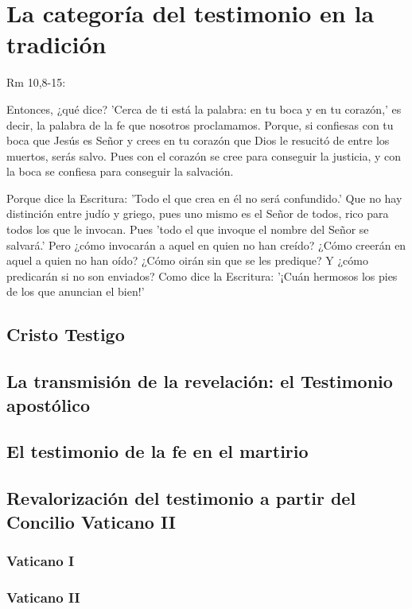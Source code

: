 \section{La categoría del testimonio en la tradición}

Rm 10,8-15: 

Entonces, ¿qué dice? 'Cerca de ti está la palabra: en tu boca y en tu corazón,'
es decir, la palabra de la fe que nosotros proclamamos. Porque, si confiesas con
tu boca que Jesús es Señor y crees en tu corazón que Dios le resucitó de entre
los muertos, serás salvo. Pues con el corazón se cree para conseguir la
justicia, y con la boca se confiesa para conseguir la salvación.

Porque dice la Escritura: 'Todo el que crea en él no será confundido.' Que no
hay distinción entre judío y griego, pues uno mismo es el Señor de todos, rico
para todos los que le invocan. Pues 'todo el que invoque el nombre del Señor se
salvará.' Pero ¿cómo invocarán a aquel en quien no han creído? ¿Cómo creerán en
aquel a quien no han oído? ¿Cómo oirán sin que se les predique? Y ¿cómo
predicarán si no son enviados? Como dice la Escritura: '¡Cuán hermosos los pies
de los que anuncian el bien!'

\subsection{Cristo Testigo}

\subsection{La transmisión de la revelación: el Testimonio apostólico}

\subsection{El testimonio de la fe en el martirio}

\subsection{Revalorización del testimonio a partir del Concilio Vaticano II}

\subsubsection{Vaticano I}

\subsubsection{Vaticano II}

